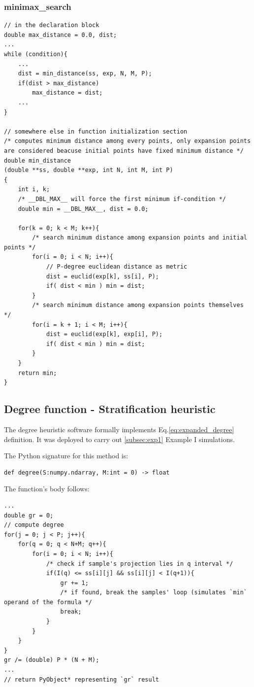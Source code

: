 \documentclass[12pt]{extarticle}
\newcommand{\meqref}[1]{Eq.\ref{#1}}
\begin{document}
\subsubsection{minimax{\_}search}

\begin{lstlisting}[style=CStyle]
// in the declaration block
double max_distance = 0.0, dist;
...
while (condition){
	...
	dist = min_distance(ss, exp, N, M, P);
	if(dist > max_distance)
		max_distance = dist;
	...
}

// somewhere else in function initialization section
/* computes minimum distance among every points, only expansion points are considered beacuse initial points have fixed minimum distance */
double min_distance
(double **ss, double **exp, int N, int M, int P)
{
    int i, k;
    /* __DBL_MAX__ will force the first minimum if-condition */
    double min = __DBL_MAX__, dist = 0.0;
    
    for(k = 0; k < M; k++){
    	/* search minimum distance among expansion points and initial points */
        for(i = 0; i < N; i++){
        	// P-degree euclidean distance as metric
            dist = euclid(exp[k], ss[i], P);
            if( dist < min ) min = dist;
        }
    	/* search minimum distance among expansion points themselves */
        for(i = k + 1; i < M; i++){
            dist = euclid(exp[k], exp[i], P);
            if( dist < min ) min = dist;
        }
    }
    return min;
}
\end{lstlisting}

\subsection{Degree function - Stratification heuristic}
\label{subsec:degree_code}
The degree heuristic software formally implements \meqref{eq:expanded_degree} definition. It was deployed to carry out \cref{subsec:exp1} Example I simulations.

The Python signature for this method is:
\begin{lstlisting}[style=CStyle]
def degree(S:numpy.ndarray, M:int = 0) -> float
\end{lstlisting}

The function's body follows:
\begin{lstlisting}[style=CStyle]
...
double gr = 0;
// compute degree
for(j = 0; j < P; j++){
    for(q = 0; q < N+M; q++){
        for(i = 0; i < N; i++){
        	/* check if sample's projection lies in q interval */
            if(I(q) <= ss[i][j] && ss[i][j] < I(q+1)){
                gr += 1;
                /* if found, break the samples' loop (simulates `min` operand of the formula */
                break;
            }
        }
    }
}
gr /= (double) P * (N + M);
...
// return PyObject* representing `gr` result
\end{lstlisting}
\end{document}
